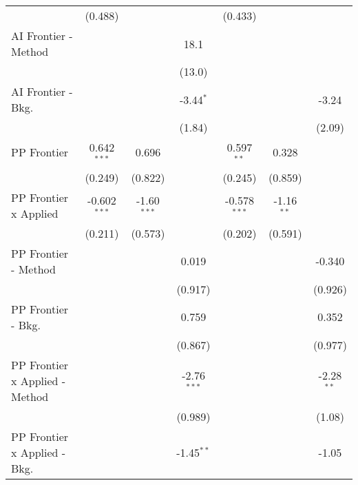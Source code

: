 \begin{tabular}{lcccccc}
                                  & (0.488)        &               &               & (0.433)        &              &   \\   
   AI Frontier - Method           &                &               & 18.1          &                &              &   \\   
                                  &                &               & (13.0)        &                &              &   \\   
   AI Frontier - Bkg.             &                &               & -3.44$^{*}$   &                &              & -3.24\\   
                                  &                &               & (1.84)        &                &              & (2.09)\\   
   PP Frontier                    & 0.642$^{***}$  & 0.696         &               & 0.597$^{**}$   & 0.328        &   \\   
                                  & (0.249)        & (0.822)       &               & (0.245)        & (0.859)      &   \\   
   PP Frontier x Applied          & -0.602$^{***}$ & -1.60$^{***}$ &               & -0.578$^{***}$ & -1.16$^{**}$ &   \\   
                                  & (0.211)        & (0.573)       &               & (0.202)        & (0.591)      &   \\   
   PP Frontier - Method           &                &               & 0.019         &                &              & -0.340\\   
                                  &                &               & (0.917)       &                &              & (0.926)\\   
   PP Frontier - Bkg.             &                &               & 0.759         &                &              & 0.352\\   
                                  &                &               & (0.867)       &                &              & (0.977)\\   
   PP Frontier x Applied - Method &                &               & -2.76$^{***}$ &                &              & -2.28$^{**}$\\   
                                  &                &               & (0.989)       &                &              & (1.08)\\   
   PP Frontier x Applied - Bkg.   &                &               & -1.45$^{**}$  &                &              & -1.05\\   

\end{tabular}
